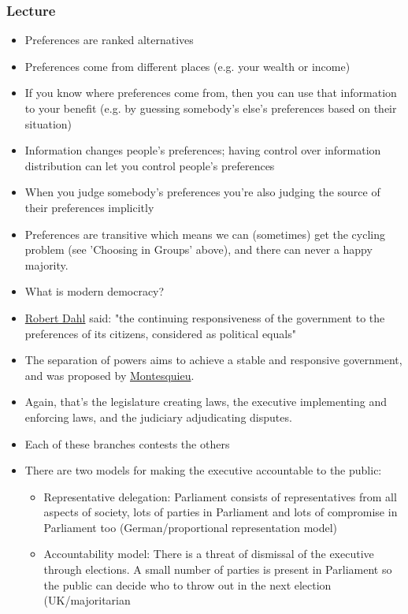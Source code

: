 \documentclass[11pt]{article}
\begin{document}
\subsubsection{Lecture}
\label{sec:org649864b}
\begin{itemize}
\item Preferences are ranked alternatives
\item Preferences come from different places (e.g. your wealth or income)
\item If you know where preferences come from, then you can use that information to
your benefit (e.g. by guessing somebody's else's preferences based on their
situation)
\item Information changes people's preferences; having control over information
distribution can let you control people's preferences
\item When you judge somebody's preferences you're also judging the source of their
preferences implicitly
\item Preferences are transitive which means we can (sometimes) get the cycling
  problem (see 'Choosing in Groups' above), and there can never a happy
  majority.
\item What is modern democracy?
\item \href{20200528210742-robert\_dahl.org}{Robert Dahl} said: "the continuing responsiveness of the government to the
preferences of its citizens, considered as political equals"
\item The separation of powers aims to achieve a stable and responsive government,
and was proposed by \href{Montesquieu.org}{Montesquieu}.
\item Again, that's the legislature creating laws, the executive implementing and
enforcing laws, and the judiciary adjudicating disputes.
\item Each of these branches contests the others
\item There are two models for making the executive accountable to the public:
\begin{itemize}
\item Representative delegation: Parliament consists of representatives from all
aspects of society, lots of parties in Parliament and lots of compromise in
Parliament too (German/proportional representation model)
\item Accountability model: There is a threat of dismissal of the executive
through elections. A small number of parties is present in Parliament so the
public can decide who to throw out in the next election (UK/majoritarian

\end{itemize}
\end{itemize}
\end{document}
